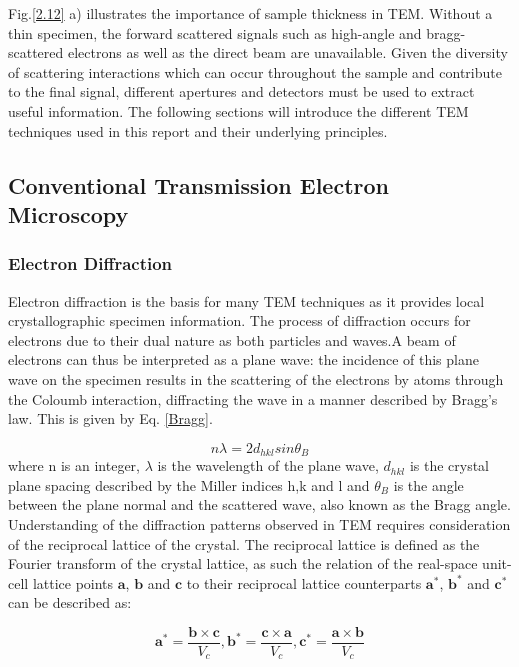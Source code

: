 Fig.\ref{2.12} a) illustrates the importance of sample thickness in TEM. Without a thin specimen, the forward scattered signals such as high-angle and bragg-scattered electrons as well as the direct beam are unavailable.
Given the diversity of scattering interactions  which can occur throughout the sample and contribute to the final signal, different apertures and detectors must be used to extract useful information. The following sections will introduce the different TEM techniques used in this report and their underlying principles. 

\subsection{Conventional Transmission Electron Microscopy} \label{TEMconventional}
\subsubsection{Electron Diffraction}
Electron diffraction is the basis for many TEM techniques as it provides local crystallographic specimen information. The process of diffraction occurs for electrons due to their dual nature as both particles and waves.A beam of electrons can thus be interpreted as a plane wave: the incidence of this plane wave on the specimen results in the scattering of the electrons by atoms through the Coloumb interaction, diffracting the wave in a  manner described by Bragg's law. This is given by Eq. \ref{Bragg}.

\begin{equation}\label{Bragg}
n\lambda = 2d_{hkl}sin\theta_{B}
\end{equation}
where n is an integer, $\lambda$ is the wavelength of the plane wave, $d_{hkl}$ is the crystal plane spacing described by the Miller indices h,k and l and $\theta_{B}$ is the angle between the plane normal and the scattered wave, also known as the Bragg angle.\\
Understanding of the diffraction patterns observed in TEM requires consideration of the reciprocal lattice of the crystal. The reciprocal lattice is defined as the Fourier transform of the crystal lattice, as such the relation of the real-space unit-cell lattice points $\mathbf{a}$, $\mathbf{b}$ and $\mathbf{c}$ to their reciprocal lattice counterparts $\mathbf{a^{*}}$, $\mathbf{b^{*}}$ and $\mathbf{c^{*}}$ can be described as:

\begin{equation}
\mathbf{a^{*}} = \frac{\mathbf{b} \times \mathbf{c}}{V_{c}}, \mathbf{b^{*}} = \frac{\mathbf{c} \times \mathbf{a}}{V_{c}}, \mathbf{c^{*}} = \frac{\mathbf{a} \times \mathbf{b}}{V_{c}}
\end{equation}

